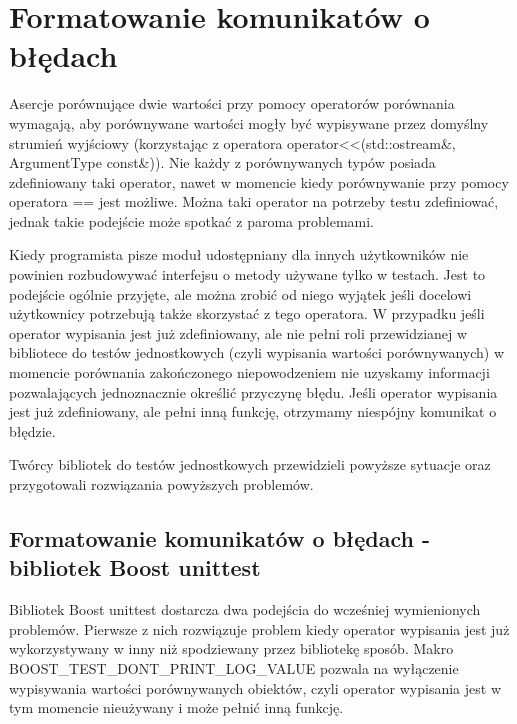 \documentclass[12pt,a4paper,notitlepage]{report}
\begin{document}
\section{Formatowanie komunikatów o błędach}

Asercje porównujące dwie wartości przy pomocy operatorów porównania wymagają, aby porównywane wartości mogły być wypisywane przez domyślny strumień wyjściowy (korzystając z operatora operator<<(std::ostream\&, ArgumentType const\&)). 
Nie każdy z porównywanych typów posiada zdefiniowany taki operator, nawet w momencie kiedy porównywanie przy pomocy operatora == jest możliwe. Można taki operator na potrzeby testu zdefiniować, jednak takie podejście może spotkać z paroma problemami.

Kiedy programista pisze moduł udostępniany dla innych użytkowników nie powinien rozbudowywać interfejsu o metody używane tylko w testach. Jest to podejście ogólnie przyjęte, ale można zrobić od niego wyjątek jeśli docelowi użytkownicy potrzebują także skorzystać z tego operatora.
W przypadku jeśli operator wypisania jest już zdefiniowany, ale nie pełni roli przewidzianej w bibliotece do testów jednostkowych (czyli wypisania wartości porównywanych) w momencie porównania zakończonego niepowodzeniem nie uzyskamy informacji pozwalających jednoznacznie określić przyczynę błędu.
Jeśli operator wypisania jest już zdefiniowany, ale pełni inną funkcję, otrzymamy niespójny komunikat o błędzie.

Twórcy bibliotek do testów jednostkowych przewidzieli powyższe sytuacje oraz przygotowali rozwiązania powyższych problemów.

\subsection{Formatowanie komunikatów o błędach - bibliotek Boost unittest}

Bibliotek Boost unittest dostarcza dwa podejścia do wcześniej wymienionych problemów.
Pierwsze z nich rozwiązuje problem kiedy operator wypisania jest już wykorzystywany w inny niż spodziewany przez bibliotekę sposób. Makro BOOST{\_}TEST{\_}DONT{\_}PRINT{\_}LOG{\_}VALUE pozwala na wyłączenie wypisywania wartości porównywanych obiektów, czyli operator wypisania jest w tym momencie nieużywany i może pełnić inną funkcję.

			
\end{document}
